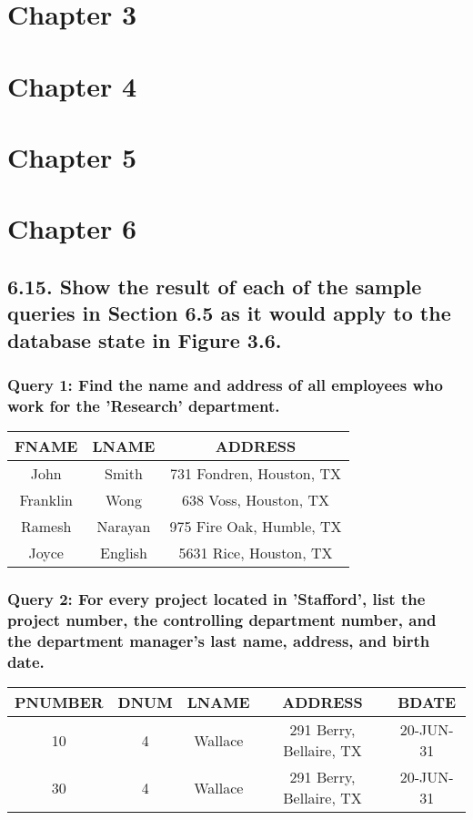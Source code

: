 \documentclass[11pt, oneside]{article}   	%
\begin{document}
\section*{Chapter 3}
\section*{Chapter 4}
\section*{Chapter 5}
\section*{Chapter 6}
\subsection*{6.15. Show the result of each of the sample queries in Section 6.5 as it would apply to the database state in Figure 3.6.} 

\subsubsection*{Query 1: Find the name and address of all employees who work for the 'Research' department.}
\begin{center}
\begin{tabular}{ c | c | c }
  FNAME & LNAME & ADDRESS \\ \hline
  John & Smith & 731 Fondren, Houston, TX \\
  Franklin & Wong & 638 Voss, Houston, TX \\
  Ramesh &  Narayan & 975 Fire Oak, Humble, TX \\
  Joyce & English & 5631 Rice, Houston, TX \\
\end{tabular}
\end{center}

\subsubsection*{Query 2: For every project located in 'Stafford', list the project number, the controlling department number, and the department manager's last name, address, and birth date.}
\begin{center} 
\begin{tabular}{ c | c | c | c | c}
  PNUMBER & DNUM & LNAME & ADDRESS & BDATE \\ \hline
  10 & 4 & Wallace & 291 Berry, Bellaire, TX &20-JUN-31 \\
  30 & 4 & Wallace & 291 Berry, Bellaire, TX & 20-JUN-31 \\ 
\end{tabular}
\end{center}
\end{document}
